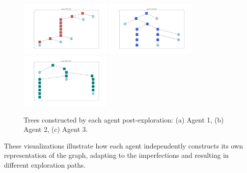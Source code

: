 \begin{figure}[H]
\centering
\includegraphics[width=0.40\textwidth]{Cap3/agent_1.png}
\includegraphics[width=0.40\textwidth]{Cap3/agent_2.png}
\includegraphics[width=0.40\textwidth]{Cap3/agent_3.png}
\caption{Trees constructed by each agent post-exploration: (a) Agent 1, (b) Agent 2, (c) Agent 3.}
\label{fig_agent_trees}
\end{figure}
    
These visualizations illustrate how each agent independently constructs its own representation of the graph,
adapting to the imperfections and resulting in different exploration paths.
    
    
    
    
    
    